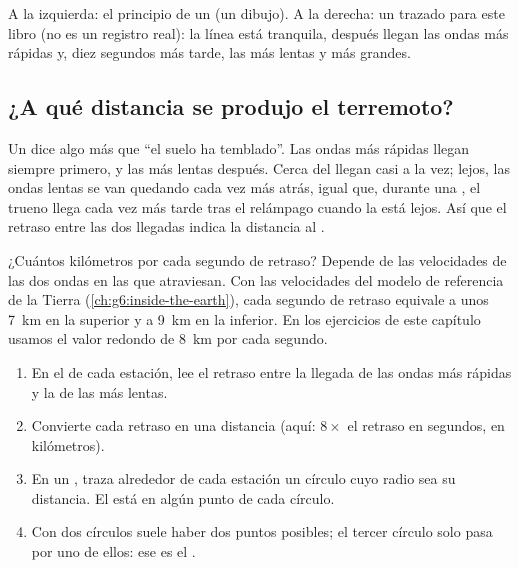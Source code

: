 \begin{omfigure}
{\small A la izquierda: el principio de un  (un dibujo). A la
derecha: un  trazado para este libro (no es un registro real): la
línea está tranquila, después llegan las ondas más rápidas y, diez segundos
más tarde, las más lentas y más grandes.}
\label{fig:g7:earthquakes:seismometer}
\end{omfigure}

\subsection*{¿A qué distancia se produjo el terremoto?}

Un  dice algo más que ``el suelo ha temblado''. Las ondas más
rápidas llegan siempre primero, y las más lentas después. Cerca del
 llegan casi a la vez; lejos, las ondas lentas se van quedando
cada vez más atrás, igual que, durante una , el trueno llega cada
vez más tarde tras el relámpago cuando la  está lejos. Así que el
retraso entre las dos llegadas indica la distancia al .

¿Cuántos kilómetros por cada segundo de retraso? Depende de las
velocidades de las dos ondas en las  que atraviesan. Con las
velocidades del modelo de referencia de la Tierra
(\cref{ch:g6:inside-the-earth}), cada segundo de retraso equivale a unos
\qty{7}{km} en la  superior y a \qty{9}{km} en la  inferior.
En los ejercicios de este capítulo usamos el valor redondo de \qty{8}{km}
por cada segundo.

\begin{method}\label{met:g7:earthquakes:three-circles}
\begin{enumerate}
  \item En el  de cada estación, lee el retraso entre la llegada
        de las ondas más rápidas y la de las más lentas.
  \item Convierte cada retraso en una distancia (aquí: $8 \times$ el
        retraso en segundos, en kilómetros).
  \item En un , traza alrededor de cada estación un círculo cuyo radio
        sea su distancia. El  está en algún punto de cada círculo.
  \item Con dos círculos suele haber dos puntos posibles; el tercer círculo
        solo pasa por uno de ellos: ese es el .
\end{enumerate}
\end{method}


